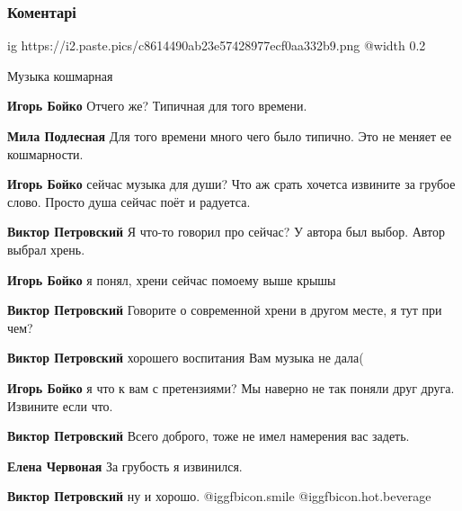  
 
 
 
 
\subsubsection{Коментарі}

\begin{itemize} %

\ifcmt
  ig https://i2.paste.pics/c8614490ab23e57428977ecf0aa332b9.png
  @width 0.2
\fi

Музыка кошмарная

\begin{itemize} %
\textbf{Игорь Бойко} Отчего же? Типичная для того времени.

\textbf{Мила Подлесная} Для того времени много чего было типично. Это не меняет ее кошмарности.

\textbf{Игорь Бойко} сейчас музыка для души? Что аж срать хочетса извините за грубое слово. Просто душа сейчас поёт и радуетса.

\begin{itemize} %
\textbf{Виктор Петровский} Я что-то говорил про сейчас? У автора был выбор. Автор выбрал хрень.

\textbf{Игорь Бойко} я понял, хрени сейчас помоему выше крышы

\textbf{Виктор Петровский} Говорите о современной хрени в другом месте, я тут при чем?

\textbf{Виктор Петровский} хорошего воспитания Вам музыка не дала(

\textbf{Игорь Бойко} я что к вам с претензиями? Мы наверно не так поняли друг друга. Извините если что.

\textbf{Виктор Петровский} Всего доброго, тоже не имел намерения вас задеть.

\textbf{Елена Червоная} За грубость я извинился.

\textbf{Виктор Петровский} ну и хорошо. @igg{fbicon.smile}  @igg{fbicon.hot.beverage} 
\end{itemize} %


\end{itemize}
\end{itemize}
